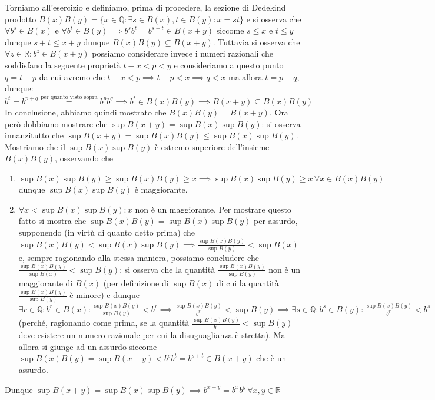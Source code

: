 \documentclass{report}
\begin{document}
\begin{mysolution}
\noindent Torniamo all'esercizio e definiamo, prima di procedere, la sezione di Dedekind prodotto $B(x)B(y) = \{x \in \mathbb{Q}: \exists s \in B(x), t \in B(y) : x = st \}$ e si osserva che $\forall b^s \in B(x)$ e $\forall b^t \in B(y) \implies b^s b^t = b^{s+t} \in B(x+y)$ siccome $s \leq x$ e $t \leq y$ dunque $s+t \leq x+y$ dunque $B(x)B(y) \subseteq B(x+y)$. Tuttavia si osserva che $\forall z \in \mathbb{R} : b^z \in B(x+y)$ possiamo considerare invece i numeri razionali che soddisfano la seguente proprietà $t-x < p < y$ e consideriamo a questo punto $q = t - p$ da cui avremo che $t-x < p \implies t - p < x \implies q < x$ ma allora $t = p + q$, dunque:
$$
b^t = b^{p+q} \stackrel{\text{per quanto visto sopra}}{=} b^p b^q \implies b^t \in B(x)B(y) \implies B(x+y) \subseteq B(x)B(y)
$$
In conclusione, abbiamo quindi mostrato che $B(x)B(y)=B(x+y)$. Ora però dobbiamo mostrare che $\sup{B(x+y)} = \sup{B(x)}\sup{B(y)}$: si osserva innanzitutto che $\sup{B(x+y)}=\sup{B(x)B(y)} \leq \sup{B(x)}\sup{B(y)}$. Mostriamo che il $\sup{B(x)}\sup{B(y)}$ è estremo superiore dell'insieme $B(x)B(y)$, osservando che
\begin{enumerate}[label=\protect\circled{\arabic*}]
	\item $\sup{B(x)}\sup{B(y)} \geq \sup{B(x)B(y)} \geq x \implies \sup{B(x)}\sup{B(y)} \geq x \, \forall x \in B(x)B(y)$ dunque $\sup{B(x)}\sup{B(y)}$ è maggiorante.
	\item $\forall x < \sup{B(x)}\sup{B(y)}: x$ non è un maggiorante. Per mostrare questo fatto si mostra che $\sup{B(x)B(y)} = \sup{B(x)}\sup{B(y)}$ per assurdo, supponendo (in virtù di quanto detto prima) che $\sup{B(x)B(y)} < \sup{B(x)}\sup{B(y)} \implies \frac{\sup{B(x)B(y)}}{\sup{B(y)}} < \sup{B(x)}$ e, sempre ragionando alla stessa maniera, possiamo concludere che $\frac{\sup{B(x)B(y)}}{\sup{B(x)}} < \sup{B(y)}$: si osserva che la quantità $\frac{\sup{B(x)B(y)}}{\sup{B(y)}}$ non è un maggiorante di $B(x)$ (per definizione di $\sup{B(x)}$ di cui la quantità $\frac{\sup{B(x)B(y)}}{\sup{B(y)}}$ è minore) e dunque $\exists r \in \mathbb{Q}: b^r \in B(x) :\frac{\sup{B(x)B(y)}}{\sup{B(y)}} < b^r \implies \frac{\sup{B(x)B(y)}}{b^r} < \sup{B(y)} \implies \exists s \in \mathbb{Q}: b^s \in B(y): \frac{\sup{B(x)B(y)}}{b^r} < b^s$ (perché, ragionando come prima, se la quantità $\frac{\sup{B(x)B(y)}}{b^r} < \sup{B(y)}$ deve esistere un numero razionale per cui la disuguaglianza è stretta). Ma allora si giunge ad un assurdo siccome $\sup{B(x)B(y)}=\sup{B(x+y)} < b^s b^t = b^{s+t} \in B(x+y)$ che è un assurdo.
\end{enumerate}
Dunque $\sup{B(x+y)}=\sup{B(x)}\sup{B(y)} \implies b^{x+y} = b^x b^y \, \forall x, y \in \mathbb{R}$
\end{mysolution}
\end{document}
